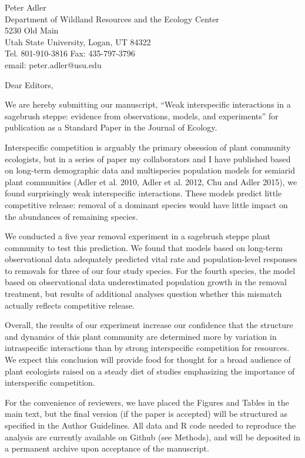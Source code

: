 \documentclass[11pt]{letter}
\begin{document}
Peter Adler\\
 Department of Wildland Resources and the Ecology Center\\
 5230 Old Main\\
 Utah State University, Logan, UT 84322\\
 Tel. 801-910-3816 \quad Fax:  435-797-3796\\
 email: peter.adler@usu.edu
 
 \medskip

Dear Editors,

We are hereby submitting our manuscript, ``Weak interspecific interactions in a sagebrush steppe: evidence from observations, models, and experiments''
for publication as a Standard Paper in the Journal of Ecology.

Interspecific competition is arguably the primary obsession of plant community ecologists, but in a series of paper my collaborators and I have published based on long-term demographic data and multispecies population models for semiarid plant communities (Adler et al. 2010, Adler et al. 2012, Chu and Adler 2015), we found surprisingly weak interspecific interactions. These models predict little competitive release: removal of a dominant species would have little impact on the abundances of remaining species.

We conducted a five year removal experiment in a sagebrush steppe plant community to test this prediction. We found that models based on long-term observational data adequately 
predicted vital rate and population-level responses to removals for three of our four study species. For the fourth species, the model based on observational data underestimated population growth in the removal treatment, but results of additional analyses question whether this mismatch actually reflects competitive release. 

Overall, the results of our experiment increase our confidence that the structure and dynamics of this plant community are determined more by variation in intraspecific interactions than by strong interspecific competition for resources. We expect this conclusion will provide food for thought for a broad audience of plant ecologists raised on a steady diet of studies emphasizing the importance of interspecific competition.

For the convenience of reviewers, we have placed the Figures and Tables in the main text, but the final 
version (if the paper is accepted) will be structured as specified in the Author Guidelines. All data and R code needed
to reproduce the analysis are currently 
available on Github (see Methods), and will be deposited in a permanent archive upon acceptance of the manuscript.
\end{document}

